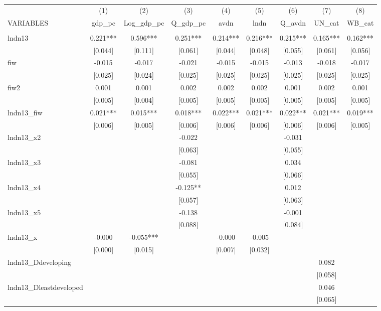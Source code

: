 \begin{tabular}{lcccccccc} \hline
 & (1) & (2) & (3) & (4) & (5) & (6) & (7) & (8) \\
VARIABLES & gdp\_pc & Log\_gdp\_pc & Q\_gdp\_pc & avdn & lndn & Q\_avdn & UN\_cat & WB\_cat \\ \hline
 &  &  &  &  &  &  &  &  \\
lndn13 & 0.221*** & 0.596*** & 0.251*** & 0.214*** & 0.216*** & 0.215*** & 0.165*** & 0.162*** \\
 & [0.044] & [0.111] & [0.061] & [0.044] & [0.048] & [0.055] & [0.061] & [0.056] \\
fiw & -0.015 & -0.017 & -0.021 & -0.015 & -0.015 & -0.013 & -0.018 & -0.017 \\
 & [0.025] & [0.024] & [0.025] & [0.025] & [0.025] & [0.025] & [0.025] & [0.025] \\
fiw2 & 0.001 & 0.001 & 0.002 & 0.002 & 0.002 & 0.001 & 0.002 & 0.001 \\
 & [0.005] & [0.004] & [0.005] & [0.005] & [0.005] & [0.005] & [0.005] & [0.005] \\
lndn13\_fiw & 0.021*** & 0.015*** & 0.018*** & 0.022*** & 0.021*** & 0.022*** & 0.021*** & 0.019*** \\
 & [0.006] & [0.005] & [0.006] & [0.006] & [0.006] & [0.006] & [0.006] & [0.005] \\
lndn13\_x2 &  &  & -0.022 &  &  & -0.031 &  &  \\
 &  &  & [0.063] &  &  & [0.055] &  &  \\
lndn13\_x3 &  &  & -0.081 &  &  & 0.034 &  &  \\
 &  &  & [0.055] &  &  & [0.066] &  &  \\
lndn13\_x4 &  &  & -0.125** &  &  & 0.012 &  &  \\
 &  &  & [0.057] &  &  & [0.063] &  &  \\
lndn13\_x5 &  &  & -0.138 &  &  & -0.001 &  &  \\
 &  &  & [0.088] &  &  & [0.084] &  &  \\
lndn13\_x & -0.000 & -0.055*** &  & -0.000 & -0.005 &  &  &  \\
 & [0.000] & [0.015] &  & [0.007] & [0.032] &  &  &  \\
lndn13\_Ddeveloping &  &  &  &  &  &  & 0.082 &  \\
 &  &  &  &  &  &  & [0.058] &  \\
lndn13\_Dleastdeveloped &  &  &  &  &  &  & 0.046 &  \\
 &  &  &  &  &  &  & [0.065] &  \\

\end{tabular}
